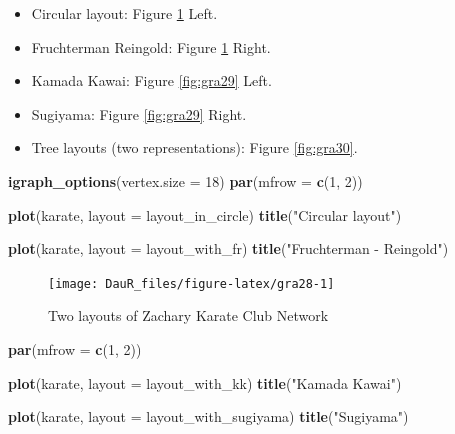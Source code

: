 \documentclass[
]{book}
\newenvironment{Shaded}{\begin{snugshade}}{\end{snugshade}}
\newcommand{\AttributeTok}[1]{\textcolor[rgb]{0.13,0.29,0.53}{#1}}
\newcommand{\DecValTok}[1]{\textcolor[rgb]{0.00,0.00,0.81}{#1}}
\newcommand{\FunctionTok}[1]{\textcolor[rgb]{0.13,0.29,0.53}{\textbf{#1}}}
\newcommand{\NormalTok}[1]{#1}
\newcommand{\StringTok}[1]{\textcolor[rgb]{0.31,0.60,0.02}{#1}}
\providecommand{\tightlist}{%
  \setlength{\itemsep}{0pt}\setlength{\parskip}{0pt}}
\begin{document}
\begin{itemize}
\tightlist
\item
  Circular layout: Figure \ref{fig:gra28} Left.
\item
  Fruchterman Reingold: Figure \ref{fig:gra28} Right.
\item
  Kamada Kawai: Figure \ref{fig:gra29} Left.
\item
  Sugiyama: Figure \ref{fig:gra29} Right.
\item
  Tree layouts (two representations): Figure \ref{fig:gra30}.
\end{itemize}

\begin{Shaded}
\begin{Highlighting}[]
\FunctionTok{igraph\_options}\NormalTok{(}\AttributeTok{vertex.size =} \DecValTok{18}\NormalTok{)}
\FunctionTok{par}\NormalTok{(}\AttributeTok{mfrow =} \FunctionTok{c}\NormalTok{(}\DecValTok{1}\NormalTok{, }\DecValTok{2}\NormalTok{))}

\FunctionTok{plot}\NormalTok{(karate, }\AttributeTok{layout =}\NormalTok{ layout\_in\_circle)}
\FunctionTok{title}\NormalTok{(}\StringTok{"Circular layout"}\NormalTok{)}

\FunctionTok{plot}\NormalTok{(karate, }\AttributeTok{layout =}\NormalTok{ layout\_with\_fr)}
\FunctionTok{title}\NormalTok{(}\StringTok{"Fruchterman {-} Reingold"}\NormalTok{)}
\end{Highlighting}
\end{Shaded}

\begin{figure}

{\centering \texttt{[image: DauR\_files/figure-latex/gra28-1]} 

}

\caption{Two layouts of Zachary Karate Club Network}\label{fig:gra28}
\end{figure}

\begin{Shaded}
\begin{Highlighting}[]
\FunctionTok{par}\NormalTok{(}\AttributeTok{mfrow =} \FunctionTok{c}\NormalTok{(}\DecValTok{1}\NormalTok{, }\DecValTok{2}\NormalTok{))}

\FunctionTok{plot}\NormalTok{(karate, }\AttributeTok{layout =}\NormalTok{ layout\_with\_kk)}
\FunctionTok{title}\NormalTok{(}\StringTok{"Kamada Kawai"}\NormalTok{)}

\FunctionTok{plot}\NormalTok{(karate, }\AttributeTok{layout =}\NormalTok{ layout\_with\_sugiyama)}
\FunctionTok{title}\NormalTok{(}\StringTok{"Sugiyama"}\NormalTok{)}
\end{Highlighting}
\end{Shaded}
\end{document}
